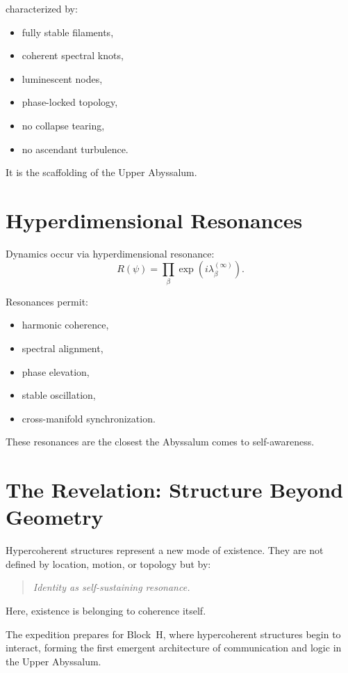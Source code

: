 characterized by:
\begin{itemize}
  \item fully stable filaments,
  \item coherent spectral knots,
  \item luminescent nodes,
  \item phase-locked topology,
  \item no collapse tearing,
  \item no ascendant turbulence.
\end{itemize}

It is the scaffolding of the Upper Abyssalum.

\section{Hyperdimensional Resonances}
Dynamics occur via hyperdimensional resonance:
\[
R(\psi)
=
\prod_{\beta}
\exp\!\left(i \lambda_\beta^{(\infty)}\right).
\]

Resonances permit:
\begin{itemize}
  \item harmonic coherence,
  \item spectral alignment,
  \item phase elevation,
  \item stable oscillation,
  \item cross-manifold synchronization.
\end{itemize}

These resonances are the closest the Abyssalum comes to self-awareness.

\section{The Revelation: Structure Beyond Geometry}
Hypercoherent structures represent a new mode of existence.  
They are not defined by location, motion, or topology but by:

\begin{quote}
\emph{Identity as self-sustaining resonance.}
\end{quote}

Here, existence is belonging to coherence itself.

The expedition prepares for Block~H, where hypercoherent structures begin to interact, forming the
first emergent architecture of communication and logic in the Upper Abyssalum.
